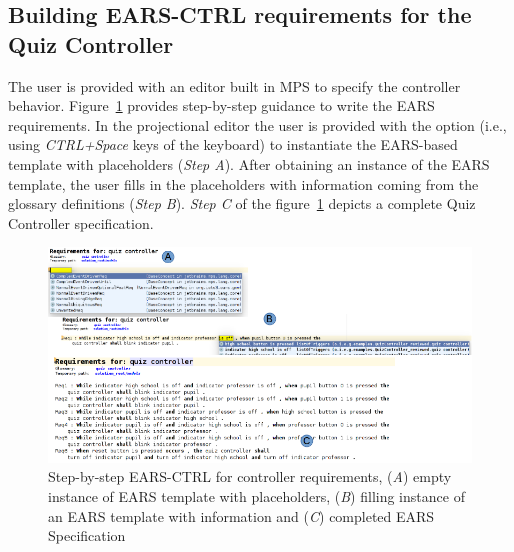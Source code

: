 \subsection{Building \textsf{EARS-CTRL} requirements for the Quiz Controller}
\vspace{-.2cm}
The user is provided with an editor built in MPS \cite{mps} to specify the
controller behavior. Figure~\ref{fig:EARS_req} provides step-by-step guidance to
write the EARS requirements. In the projectional editor the user is provided with the option
(i.e., using \emph{CTRL+Space} keys of the keyboard) to instantiate the
EARS-based template with placeholders (\emph{Step A}). After obtaining an
instance of the EARS template, the user fills in the placeholders with
information coming from the glossary definitions (\emph{Step B}). \emph{Step C}
of the figure~\ref{fig:EARS_req} depicts a complete Quiz Controller specification.
\begin{figure}[!h]
\centering
\includegraphics[width=1.2\textwidth]{./images/Req_Spec_Steps.png}
\caption{Step-by-step \textsf{EARS-CTRL} for controller requirements, (\emph{A})
empty instance of EARS template with placeholders, (\emph{B}) filling instance
of an EARS template with information and (\emph{C}) completed EARS Specification
}
\label{fig:EARS_req}
\vspace{-.6cm}
\end{figure}
\vspace{-.2cm}
